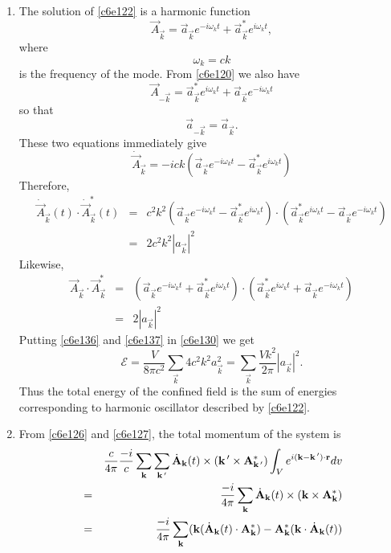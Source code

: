 \begin{enumerate}
\item The solution of \eqref{c6e122} is a harmonic function
\begin{equation}\label{c6e131}
\vec{A}_\vec{k} = \vec{a}_\vec{k}e^{-i\omega_k t} + \vec{a}_\vec{k}^\ast e^{i\omega_k t},
\end{equation}
where
\begin{equation}\label{c6e132}
\omega_k = ck
\end{equation}
is the frequency of the mode. From \eqref{c6e120} we also have
\begin{equation}\label{c6e133}
\vec{A}_{-\vec{k}} = \vec{a}_\vec{k}^\ast e^{i\omega_k t} + \vec{a}_\vec{k} e^{-i\omega_k t}
\end{equation}
so that
\begin{equation}\label{c6e134}
\vec{a}_{-\vec{k}} = \vec{a}_\vec{k}.
\end{equation}
These two equations immediately give
\begin{equation}\label{c6e135}
\dot{\vec{A}}_\vec{k} = -ick(\vec{a}_\vec{k}e^{-i\omega_k t} - \vec{a}_\vec{k}^\ast e^{i\omega_k t})
\end{equation}
Therefore,
\begin{eqnarray}
\dot{\vec{A}}_\vec{k}(t)\cdot\dot{\vec{A}}_{\vec{k}}^\ast(t) &=& c^2k^2
(\vec{a}_\vec{k}e^{-i\omega_k t} - \vec{a}_\vec{k}^\ast e^{i\omega_k t})\cdot
(\vec{a}_\vec{k}^\ast e^{i\omega_k t} - \vec{a}_\vec{k} e^{-i\omega_k t}) \nonumber \\
&=& 2c^2k^2|a_\vec{k}|^2 \label{c6e136}
\end{eqnarray}
Likewise,
\begin{eqnarray}
\vec{A}_\vec{k}\cdot\vec{A}_\vec{k}^\ast &=& 
(\vec{a}_\vec{k}e^{-i\omega_k t} + \vec{a}_\vec{k}^\ast e^{i\omega_k t})\cdot
(\vec{a}_\vec{k}^\ast e^{i\omega_k t} + \vec{a}_\vec{k} e^{-i\omega_k t}) \nonumber \\
&=& 2|a_\vec{k}|^2 \label{c6e137}
\end{eqnarray}
Putting \eqref{c6e136} and \eqref{c6e137} in \eqref{c6e130} we get
\begin{equation}\label{c6e138}
\mathcal{E} = \frac{V}{8\pi c^2}\sum_{\vec{k}} 4c^2k^2 a^2_\vec{k}
= \sum_{\vec{k}} \frac{Vk^2}{2\pi}|a_\vec{k}|^2.
\end{equation}
Thus the total energy of the confined field is the sum of energies corresponding
to harmonic oscillator described by \eqref{c6e122}.

\item From \eqref{c6e126} and \eqref{c6e127}, the total momentum of the system is
\begin{eqnarray*}
& & \frac{c}{4\pi}\frac{-i}{c}\sum_{\mathbf{k}}\sum_{\mathbf{k}^{\,\prime}}
\dot{\mathbf{A}}_\mathbf{k}(t) \times (\mathbf{k}^{\,\prime} \times \mathbf{A}^\ast_{\mathbf{k}^{\,\prime}})
\int_V e^{i(\mathbf{k} - \mathbf{k}^{\,\prime})\cdot\mathbf{r}}dv \\
&=& \frac{-i}{4\pi}\sum_{\mathbf{k}}\dot{\mathbf{A}}_\mathbf{k}(t) \times (\mathbf{k} \times \mathbf{A}^\ast_{\mathbf{k}}) \\
&=& \frac{-i}{4\pi}\sum_\mathbf{k}(\mathbf{k}(\dot{\mathbf{A}}_\mathbf{k}(t)\cdot\mathbf{A}^\ast_{\mathbf{k}}) -
\mathbf{A}^\ast_{\mathbf{k}}(\mathbf{k}\cdot\dot{\mathbf{A}}_\mathbf{k}(t))
\end{eqnarray*}
\end{enumerate}